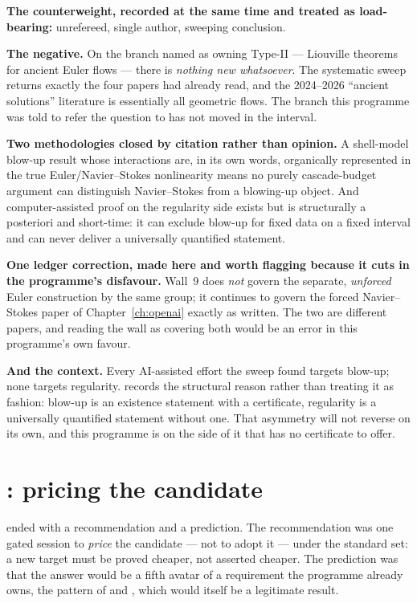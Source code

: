 \textbf{The counterweight, recorded at the same time and treated as
load-bearing:} unrefereed, single author, sweeping conclusion.

\textbf{The negative.} On the branch  named as owning Type-II ---
Liouville theorems for ancient Euler flows --- there is \emph{nothing new
whatsoever}. The systematic sweep returns exactly the four papers  had
already read, and the 2024--2026 ``ancient solutions'' literature is essentially
all geometric flows. The branch this programme was told to refer the question to
has not moved in the interval.

\textbf{Two methodologies closed by citation rather than opinion.} A
shell-model blow-up result whose interactions are, in its own words, organically
represented in the true Euler/Navier--Stokes nonlinearity means no purely
cascade-budget argument can distinguish Navier--Stokes from a blowing-up object.
And computer-assisted proof on the regularity side exists but is structurally a
posteriori and short-time: it can exclude blow-up for fixed data on a fixed
interval and can never deliver a universally quantified statement.

\textbf{One ledger correction, made here and worth flagging because it cuts in
the programme's disfavour.} Wall~9 does \emph{not} govern the separate,
\emph{unforced} Euler construction by the same group; it continues to govern the
forced Navier--Stokes paper of Chapter~\ref{ch:openai} exactly as written. The
two are different papers, and reading the wall as covering both would be an
error in this programme's own favour.

\textbf{And the context.} Every AI-assisted effort the sweep found targets
blow-up; none targets regularity.  records the structural reason rather
than treating it as fashion: blow-up is an existence statement with a
certificate, regularity is a universally quantified statement without one. That
asymmetry will not reverse on its own, and this programme is on the side of it
that has no certificate to offer.

\section{\texorpdfstring{: pricing the candidate}{S57: pricing the candidate}}
\label{sec:pt-s57}

 ended with a recommendation and a prediction. The recommendation was one
gated session to \emph{price} the candidate --- not to adopt it --- under the
standard  set: a new target must be proved cheaper, not asserted cheaper.
The prediction was that the answer would be a fifth avatar of a requirement the
programme already owns, the pattern of  and , which would itself
be a legitimate result.

